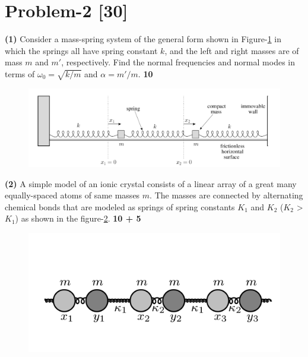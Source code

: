 \documentclass[12pt, a4paper]{article}
\begin{document}
\section*{Problem-2 \hfill \textbf{[30]}}

\noindent
\textbf{(1)} Consider a mass-spring system of the general form shown in Figure-\ref{fig:Coupled-Osc} 
in which the springs all have spring constant $k$, and the left and right masses are of mass $m$ 
and $m'$, respectively. Find the normal frequencies and normal modes in terms of $\omega_0=\sqrt{k/m}$
and $\alpha=m'/m$. \hfill\textbf{10}

\begin{figure}[h]
    \centering
    \includegraphics[scale=0.3]{figs/Coupled-Osc.png}
    \caption{}
    \label{fig:Coupled-Osc}
\end{figure} 



\noindent
\textbf{(2)} A simple model of an ionic crystal consists of a linear array of a great many 
equally-spaced  atoms of same masses $m$. The masses are connected by alternating chemical 
bonds that are modeled as springs of spring constants $K_1$ and $K_2$ ($K_2$ > $K_1$) as shown 
in the figure-\ref{fig:Alternating_chain}. \hfill\textbf{10 + 5}
\begin{figure}[h]
    \centering
    \includegraphics[scale=0.4]{figs/Alternating_chain.png}
    \caption{}
    \label{fig:Alternating_chain}
\end{figure} 
\end{document}
